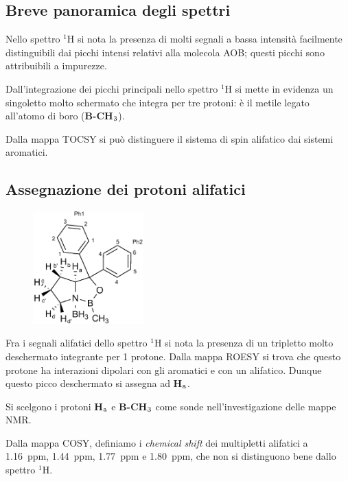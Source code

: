 \documentclass[a4paper, italian, oneside, 12pt]{article}
\begin{document}
\subsection{Breve panoramica degli spettri}
Nello spettro $^1$H si nota la presenza di molti segnali a bassa intensità facilmente distinguibili dai picchi intensi relativi alla molecola AOB; questi picchi sono attribuibili a impurezze. 

Dall'integrazione dei picchi principali nello spettro $^1$H si mette in evidenza un singoletto molto schermato che integra per tre protoni: è il metile legato all'atomo di boro ({\bf{B-CH$_{\textrm 3}$}}).

Dalla mappa TOCSY si può distinguere il sistema di spin alifatico dai sistemi aromatici. 
\subsection{Assegnazione dei protoni alifatici}


\begin{figure}
  \begin{center}
    \includegraphics[width=0.38\textwidth]{img/AOB2.png}
  \end{center}
\end{figure}

Fra i segnali alifatici dello spettro $^1$H si nota la presenza di un tripletto molto deschermato integrante per 1 protone. Dalla mappa ROESY si trova che questo protone ha interazioni dipolari con gli aromatici e con un alifatico. Dunque questo picco deschermato si assegna ad {\bf{H$_{\textrm a}$}}.

Si scelgono i protoni {\bf{H$_{\textrm a}$}} e {\bf{B-CH$_{\textrm 3}$}} come sonde nell'investigazione delle mappe NMR.

Dalla mappa COSY, definiamo i {\emph{chemical shift}} dei multipletti alifatici a 1.16~ppm, 1.44~ppm, 1.77~ppm e 1.80~ppm, che non si distinguono bene dallo spettro $^1$H.
\end{document}
